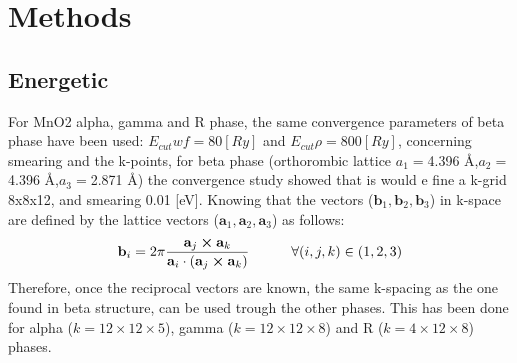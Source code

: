 \section{Methods}

\subsection{Energetic}
For MnO2 alpha, gamma and R phase, the same convergence parameters of beta phase have been used: $E_{cut}wf = 80 [Ry]$ and $E_{cut}\rho = 800 [Ry]$, concerning smearing and the k-points, for beta phase (orthorombic lattice $a_1=$4.396 \AA,$a_2=$4.396 \AA,$a_3=$2.871 \AA) the convergence study showed that is would e fine a k-grid 8x8x12, and smearing 0.01 [eV]. Knowing that the vectors ($\mathbf{b}_1, \mathbf{b}_2,\mathbf{b}_3$) in k-space are defined by the lattice vectors ($\mathbf{a}_1, \mathbf{a}_2,\mathbf{a}_3$) as follows:
\begin{equation}
\mathbf{b}_i = 2 \pi \frac{\mathbf{a}_j \cross \mathbf{a}_k}{\mathbf{a}_i \cdot (\mathbf{a}_j \cross \mathbf{a}_k)} ~~~~~~~~~ \forall (i,j,k) \in (1,2,3)
\label{eq:k-vect}
\end{equation}
Therefore, once the reciprocal vectors are known, the same k-spacing as the one found in beta structure, can be used trough the other phases. This has been done for alpha ($k=12\times 12\times 5$), gamma ($k=12\times 12\times 8$) and R ($k=4\times 12\times 8$) phases.



